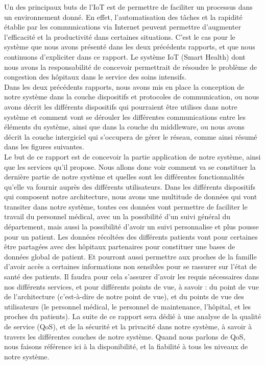 Un des principaux buts de l’IoT est de permettre de faciliter un processus dans un environnement donné. En effet, l’automatisation des tâches et la rapidité établie par les communications via Internet peuvent permettre d’augmenter l’efficacité et la productivité dans certaines situations. C’est le cas pour le système que nous avons présenté dans les deux précédents rapports, et que nous continuons d’expliciter dans ce rapport. Le système IoT (Smart Health) dont nous avons la responsabilité de concevoir permettrait de résoudre le problème de congestion des hôpitaux dans le service des soins intensifs.
\\

Dans les deux précédents rapports, nous avons mis en place la conception de notre système dans la couche dispositifs et protocoles de communication, ou nous avons décrit les différents dispositifs qui pourraient être utilises dans notre système et comment vont se dérouler les différentes communications entre les éléments du système, ainsi que dans la couche du middleware, ou nous avons décrit la couche intergiciel qui s’occupera de gérer le réseau, comme ainsi résumé dans les figures suivantes.
\\

Le but de ce rapport est de concevoir la partie application de notre système, ainsi que les services qu’il propose. Nous allons donc voir comment va se constituer la dernière partie de notre système et quelles sont les différentes fonctionnalités qu’elle va fournir auprès des différents utilisateurs. Dans les différents dispositifs qui composent notre architecture, nous avons une multitude de données qui vont transiter dans notre système, toutes ces données vont permettre de faciliter le travail du personnel médical, avec un la possibilité d’un suivi général du département, mais aussi la possibilité d’avoir un suivi personnalise et plus pousse pour un patient. Les données récoltées des différents patients vont pour certaines être partagées avec des hôpitaux partenaires pour constituer une bases de données global de patient. Et pourront aussi permettre aux proches de la famille d’avoir accès a certaines informations non sensibles pour se rassurer sur l'état de santé des patients. Il faudra pour cela s’assurer d’avoir les requis nécessaires dans nos différents services, et pour différents points de vue, à savoir : du point de vue de l’architecture (c’est-à-dire de notre point de vue), et du points de vue des utilisateurs (le personnel médical, le personnel de maintenance, l’hôpital, et les proches du patients). La suite de ce rapport sera dédié à une analyse de la qualité de service (QoS), et de la sécurité et la privacité dans notre système, à savoir à travers les différentes couches de notre système. Quand nous parlons de QoS, nous faisons référence ici à la disponibilité, et la fiabilité à tous les niveaux de notre système. 


